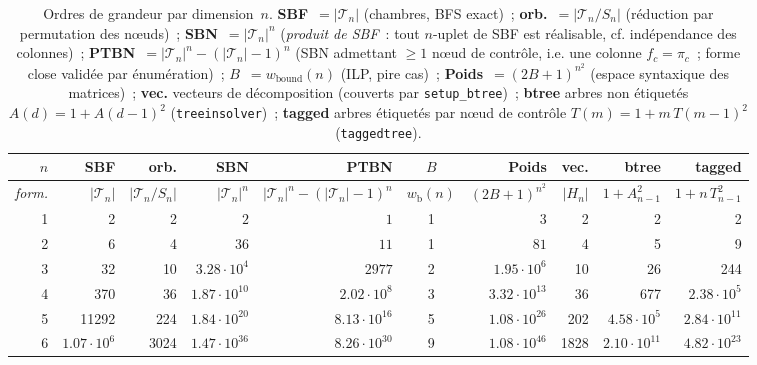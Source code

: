 \begin{table}[H]
\centering
\small
\setlength{\tabcolsep}{4pt}
\caption{Ordres de grandeur par dimension~$n$. \textbf{SBF}~$=|\mathcal{T}_n|$ (chambres,
BFS exact)~; \textbf{orb.}~$=|\mathcal{T}_n/S_n|$ (réduction par permutation des nœuds)~;
\textbf{SBN}~$=|\mathcal{T}_n|^n$ (\emph{produit de SBF}~: tout $n$-uplet de SBF est
réalisable, cf. indépendance des colonnes)~; \textbf{PTBN}~$=|\mathcal{T}_n|^n-(|\mathcal{T}_n|-1)^n$
(SBN admettant $\ge 1$ nœud de contrôle, i.e. une colonne $f_c=\pi_c$~; forme close validée par
énumération)~; \textbf{$B$}~$=w_{\text{bound}}(n)$ (ILP, pire cas)~; \textbf{Poids}~$=(2B+1)^{n^2}$
(espace syntaxique des matrices)~; \textbf{vec.} vecteurs de décomposition (couverts par
\texttt{setup\_btree})~; \textbf{btree} arbres non étiquetés $A(d)=1+A(d-1)^2$
(\texttt{treeinsolver})~; \textbf{tagged} arbres étiquetés par nœud de contrôle
$T(m)=1+m\,T(m-1)^2$ (\texttt{taggedtree}).}
\label{tab:echelles}
\begin{tabular}{r r r r r c r r r r}
\toprule
$n$ & SBF & orb. & SBN & PTBN & $B$ & Poids & vec. & btree & tagged \\
\midrule
\emph{form.} & $|\mathcal{T}_n|$ & $|\mathcal{T}_n/S_n|$ & $|\mathcal{T}_n|^n$ & $|\mathcal{T}_n|^n{-}(|\mathcal{T}_n|{-}1)^n$ & $w_{\mathrm{b}}(n)$ & $(2B{+}1)^{n^2}$ & $|H_n|$ & $1{+}A_{n-1}^2$ & $1{+}n\,T_{n-1}^2$ \\
\midrule
1 & 2      & 2   & $2$                 & $1$                 & 1 & $3$                 & 2   & 2                 & 2 \\
2 & 6      & 4   & $36$                & $11$                & 1 & $81$                & 4   & 5                 & 9 \\
3 & 32     & 10  & $3.28{\cdot}10^{4}$ & $2977$              & 2 & $1.95{\cdot}10^{6}$ & 10  & 26                & 244 \\
4 & 370    & 36  & $1.87{\cdot}10^{10}$& $2.02{\cdot}10^{8}$ & 3 & $3.32{\cdot}10^{13}$& 36  & 677               & $2.38{\cdot}10^{5}$ \\
5 & 11292  & 224 & $1.84{\cdot}10^{20}$& $8.13{\cdot}10^{16}$& 5 & $1.08{\cdot}10^{26}$& 202 & $4.58{\cdot}10^{5}$ & $2.84{\cdot}10^{11}$ \\
6 & $1.07{\cdot}10^{6}$ & 3024 & $1.47{\cdot}10^{36}$& $8.26{\cdot}10^{30}$& 9 & $1.08{\cdot}10^{46}$& 1828 & $2.10{\cdot}10^{11}$ & $4.82{\cdot}10^{23}$ \\
\bottomrule
\end{tabular}
\end{table}

